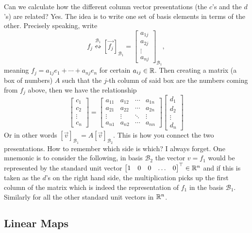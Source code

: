 \documentclass[12pt]{amsart}
\begin{document}
Can we calculate how the different column vector presentations (the $c$'s and the $d$'s) are related? Yes. The idea is to write one set of basis elements in terms of the other. Precisely speaking, write 
\[
	f_j \stackrel{\mathcal{B}_1}{\leftrightsquigarrow} [\vec{f_j}]_{\mathcal{B}_1} = \begin{bmatrix} a_{1j} \\ a_{2j} \\ \vdots\\ a_{nj} \end{bmatrix}_{\mathcal{B}_1},
\] 
meaning $f_j = a_{1j} e_1 + \cdots + a_{nj} e_n$ for certain $a_{ij} \in \mathbb{R}$. Then creating a matrix (a box of numbers) $A$ such that the $j$-th column of said box are the numbers coming from $f_j$ above, then we have the relationship
\begin{equation}\label{eq:changeOfBasis}
	\begin{bmatrix} c_1\\ c_2\\ \vdots \\ c_n \end{bmatrix} = \begin{bmatrix} a_{11} & a_{12} & \cdots & a_{1n} \\ 
a_{21} & a_{22} & \cdots & a_{2n}\\
\vdots & \vdots & \ddots & \vdots \\
a_{n1} & a_{n2} & \cdots  & a_{nn} \end{bmatrix} 
\begin{bmatrix} d_1 \\ d_2\\ \vdots \\d_n \end{bmatrix} 
\end{equation}
Or in other words $[\vec{v}]_{\mathcal{B}_1} = A [\vec{v}]_{\mathcal{B}_2}$.  This is how you connect the two presentations. How to remember which side is which? I always forget. One mnemonic is to consider the following, in basis $\mathcal{B}_2$ the vector $v=f_1$ would be represented by the standard unit vector $\begin{bmatrix} 1 & 0 & 0 & \ldots & 0 \end{bmatrix}^\top \in \mathbb{R}^n$ and if this is taken as the $d$'s on the right hand side, the multiplication picks up the first column of the matrix which is indeed the representation of $f_1$ in the basis $\mathcal{B}_1$. Similarly for all the other standard unit vectors in $\mathbb{R}^n$. 


\subsection*{Linear Maps}
\end{document}
